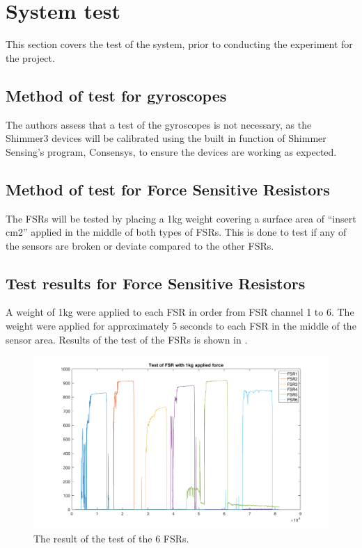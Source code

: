 \section{System test}
This section covers the test of the system, prior to conducting the experiment for the project. 

\subsection{Method of test for gyroscopes}
The authors assess that a test of the gyroscopes is not necessary, as the Shimmer3 devices will be calibrated using the built in function of Shimmer Sensing’s program, Consensys, to ensure the devices are working as expected.



\subsection{Method of test for Force Sensitive Resistors}
The FSRs will be tested by placing a 1kg weight covering a surface area of “insert cm2” applied in the middle of both types of FSRs. This is done to test if any of the sensors are broken or deviate compared to the other FSRs. %


\subsection{Test  results for Force Sensitive Resistors}
A weight of 1kg were applied to each FSR in order from FSR channel 1 to 6. The weight were applied for approximately 5 seconds to each FSR in the middle of the sensor area. Results of the test of the FSRs is shown in .

\begin{figure}[H]
	\includegraphics[width=.6\textwidth]{figures/FSRTestPlot1kg}
	\caption{The result of the test of the 6 FSRs.}
	\label{fig:FSRTestPlot1kg}  %
\end{figure}

